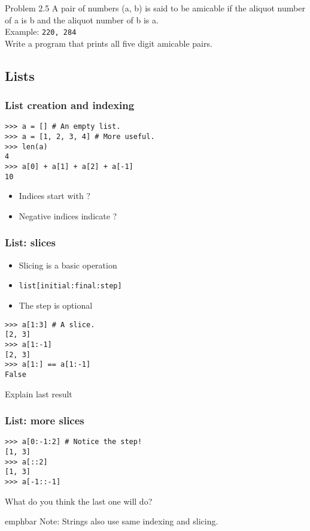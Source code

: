 \documentclass[14pt,compress]{beamer}
\newcommand{\emphbar}[1]
{\begin{beamercolorbox}[rounded=true]{emphbar} 
      {#1}
 \end{beamercolorbox}
}
\newcounter{time}
\newcommand{\inctime}[1]{\addtocounter{time}{#1}{\tiny \thetime\ m}}
\newcommand{\typ}[1]{\texttt{#1}}
\begin{document}
\begin{frame}{Problem 2.5}
  A pair of numbers (a, b) is said to be \alert{amicable} if the aliquot number of a is b and the aliquot number of b is a.\\
  Example: \texttt{220, 284}\\
  Write a program that prints all five digit amicable pairs.
  \inctime{25}
\end{frame}


\subsection{Lists}

\begin{frame}[fragile]
  \frametitle{List creation and indexing}
\begin{lstlisting}
>>> a = [] # An empty list.
>>> a = [1, 2, 3, 4] # More useful.
>>> len(a) 
4
>>> a[0] + a[1] + a[2] + a[-1]
10
\end{lstlisting}
  \begin{itemize}
  \item Indices start with ?
  \item Negative indices indicate ?
  \end{itemize}
\end{frame}

\begin{frame}[fragile]
  \frametitle{List: slices}
  \begin{itemize}
  \item Slicing is a basic operation
  \item \typ{list[initial:final:step]}
  \item  The step is optional
  \end{itemize}
\begin{lstlisting}
>>> a[1:3] # A slice.
[2, 3]
>>> a[1:-1]
[2, 3]
>>> a[1:] == a[1:-1]
False  
\end{lstlisting}
Explain last result
\end{frame}

\begin{frame}[fragile]
  \frametitle{List: more slices}
\begin{lstlisting}
>>> a[0:-1:2] # Notice the step!
[1, 3]
>>> a[::2]
[1, 3]
>>> a[-1::-1]
\end{lstlisting}
What do you think the last one will do?
  \emphbar{Note: Strings also use same indexing and slicing.}
\end{frame}
\end{document}

